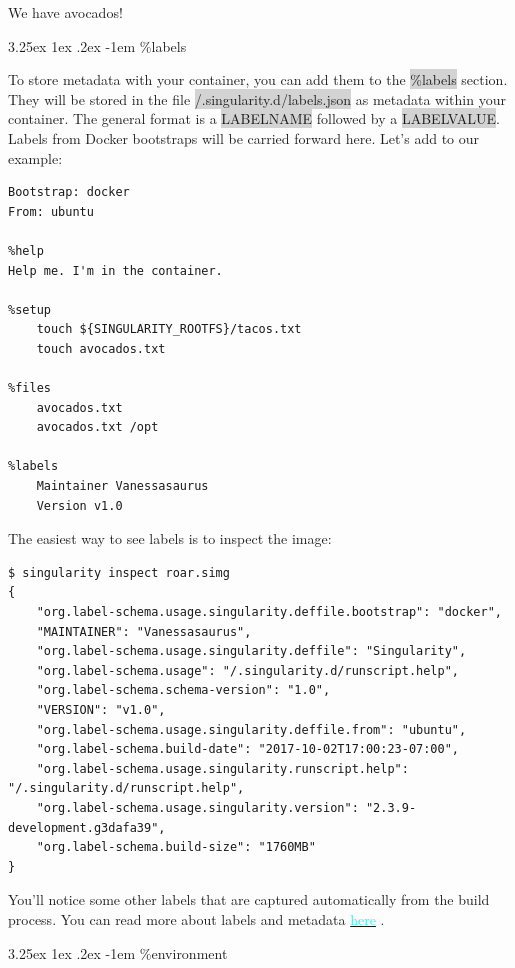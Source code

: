 \documentclass[a4paper]{article}
\makeatletter
\renewcommand\paragraph{\@startsection{paragraph}{5}{\z@}%
  {3.25ex \@plus1ex \@minus.2ex}%
  {-1em}%
  {\normalfont\normalsize\bfseries}}
\makeatother
\begin{document}
We have avocados!

\paragraph{\%labels}

To store metadata with your container, you can add them to the \colorbox{lightgray}{\%labels} section. They will be stored in the file \colorbox{lightgray}{/.singularity.d/labels.json} as metadata within your container. The general format is a \colorbox{lightgray}{LABELNAME} followed by a \colorbox{lightgray}{LABELVALUE}. Labels from Docker bootstraps will be carried forward here. Let’s add to our example:

\begin{lstlisting}[frame=single]  
Bootstrap: docker
From: ubuntu

%help
Help me. I'm in the container.

%setup
    touch ${SINGULARITY_ROOTFS}/tacos.txt
    touch avocados.txt

%files
    avocados.txt
    avocados.txt /opt    

%labels
    Maintainer Vanessasaurus
    Version v1.0
\end{lstlisting}

The easiest way to see labels is to inspect the image:

\begin{lstlisting}[frame=single]  
$ singularity inspect roar.simg
{
    "org.label-schema.usage.singularity.deffile.bootstrap": "docker",
    "MAINTAINER": "Vanessasaurus",
    "org.label-schema.usage.singularity.deffile": "Singularity",
    "org.label-schema.usage": "/.singularity.d/runscript.help",
    "org.label-schema.schema-version": "1.0",
    "VERSION": "v1.0",
    "org.label-schema.usage.singularity.deffile.from": "ubuntu",
    "org.label-schema.build-date": "2017-10-02T17:00:23-07:00",
    "org.label-schema.usage.singularity.runscript.help": "/.singularity.d/runscript.help",
    "org.label-schema.usage.singularity.version": "2.3.9-development.g3dafa39",
    "org.label-schema.build-size": "1760MB"
}
\end{lstlisting}

You’ll notice some other labels that are captured automatically from the build process. You can read more about labels and metadata  \hyperref[sec:envandmetadata]{{\textcolor{cyan}{here}}} .

\paragraph{\%environment}
		
\end{document}
